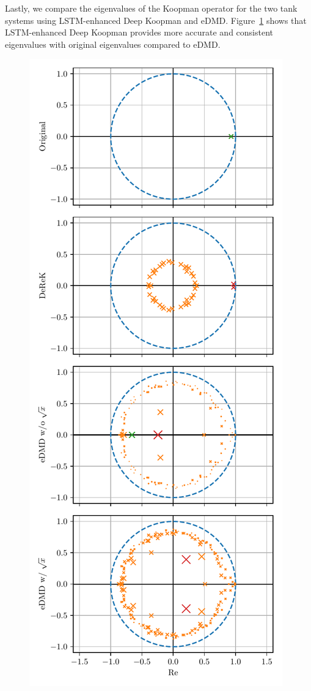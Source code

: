 \documentclass[conference]{IEEEtran}
\begin{document}
Lastly, we compare the eigenvalues of the Koopman operator for the two tank systems using LSTM-enhanced Deep Koopman and eDMD. Figure~\ref{fig:two_tanks_eigs} shows that LSTM-enhanced Deep Koopman provides more accurate and consistent eigenvalues with original eigenvalues compared to eDMD.

\begin{figure}[htbp]\label{fig:two_tanks_eigs}
    \centerline{\includegraphics[width=\linewidth]{figures/eigenvalues_comparison.pdf}}

\end{figure}
\end{document}

